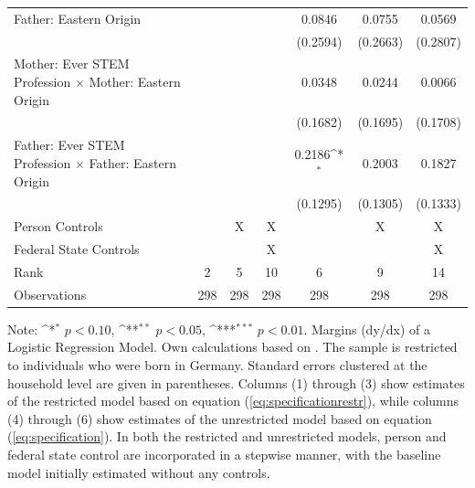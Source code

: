 \documentclass[a4paper, oneside, hyperfootnotes = false]{article}
\def\sym#1{\ifmmode^{#1}\else\(^{#1}\)\fi}
\begin{document}
{\begin{landscape}
\begin{table}[ht]
\begin{center}
{\begin{tabular}{l*{6}{c}}
					\addlinespace
					Father: Eastern Origin&                     &                     &                     &      0.0846         &      0.0755         &      0.0569         \\
					&                     &                     &                     &    (0.2594)         &    (0.2663)         &    (0.2807)         \\
					\addlinespace
					Mother: Ever STEM Profession $\times$ Mother: Eastern Origin&                     &                     &                     &      0.0348         &      0.0244         &      0.0066         \\
					&                     &                     &                     &    (0.1682)         &    (0.1695)         &    (0.1708)         \\
					\addlinespace
					Father: Ever STEM Profession $\times$ Father: Eastern Origin&                     &                     &                     &      0.2186\sym{*}  &      0.2003         &      0.1827         \\
					&                     &                     &                     &    (0.1295)         &    (0.1305)         &    (0.1333)         \\
					\midrule
					Person Controls & & X  & X & & X & X \\
					Federal State Controls & & & X & & & X \\
					Rank                &      2         &      5         &     10         &      6         &      9         &     14         \\
					Observations                   &    298         &    298         &    298         &    298         &    298         &    298         \\
					\bottomrule
			\end{tabular}}
			
			\vspace{2mm}
			
			\parbox{15cm}{
				\linespread{1}\footnotesize Note: \sym{*} \(p<0.10\), \sym{**} \(p<0.05\), \sym{***} \(p<0.01\). Margins (dy/dx) of a Logistic Regression Model. Own calculations based on \cite{SOEP2023}. The sample is restricted to individuals who were born in Germany. Standard errors clustered at the household level are given in parentheses. Columns (1) through (3) show estimates of the restricted model based on equation (\ref{eq:specificationrestr}), while columns (4) through (6) show estimates of the unrestricted model based on equation (\ref{eq:specification}). In both the restricted and unrestricted models, person and federal state control are incorporated in a stepwise manner, with the baseline model initially estimated without any controls.}
			

\end{center}
\end{table}
\end{landscape}}
\end{document}
